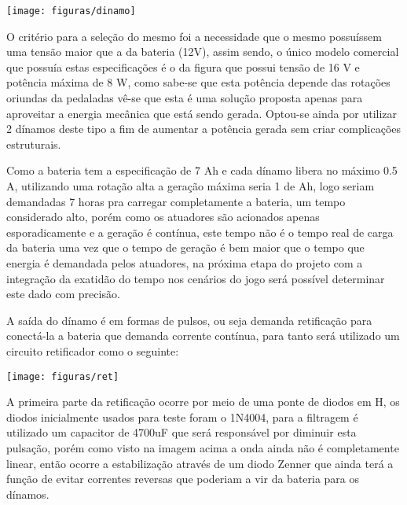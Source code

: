  \begin{center}
    	\texttt{[image: figuras/dinamo]}
        \label{dinamo}
    \end{center}
O critério para a seleção do mesmo foi a necessidade que o mesmo possuíssem uma tensão maior que a da bateria (12V), assim sendo, o único modelo comercial que possuía estas especificações é o da figura que possui tensão de 16 V e potência máxima de 8 W, como sabe-se que esta potência depende das rotações oriundas da pedaladas vê-se que esta é uma solução proposta apenas para aproveitar a energia mecânica que está sendo gerada. Optou-se ainda por utilizar 2 dínamos deste tipo a fim de aumentar a potência gerada sem criar complicações estruturais.

Como a bateria tem a especificação de 7 Ah e cada dínamo libera no máximo 0.5 A, utilizando uma rotação alta a geração máxima seria 1 de Ah, logo seriam demandadas 7 horas pra carregar completamente a bateria, um tempo considerado alto, porém como os atuadores são acionados apenas esporadicamente e a geração é contínua, este tempo não é o tempo real de carga da bateria uma vez que o tempo de geração é bem maior que o tempo que energia é demandada pelos atuadores, na próxima etapa do projeto com a integração da exatidão do tempo nos cenários do jogo será possível determinar este dado com precisão.

A saída do dínamo é em formas de pulsos, ou seja demanda retificação para conectá-la a bateria que demanda corrente contínua, para tanto será utilizado um circuito retificador como o seguinte:



 \begin{center}
    	\texttt{[image: figuras/ret]}
        \label{ret}
    \end{center}

A primeira parte da retificação ocorre por meio de uma ponte de diodos em H, os diodos inicialmente usados para teste foram o 1N4004, para a filtragem é utilizado um capacitor de 4700uF que será responsável por diminuir esta pulsação, porém como visto na imagem acima a onda ainda não é completamente linear, então ocorre a estabilização através de um diodo Zenner que ainda terá a função de evitar correntes reversas que poderiam a vir da bateria para os dínamos.
